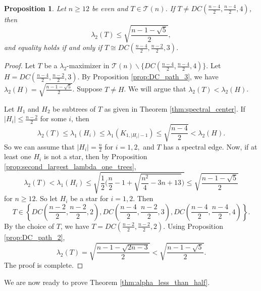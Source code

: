 \documentclass[11pt]{article}
\theoremstyle{plain}
\newtheorem{proposition}[theorem]{Proposition}
\numberwithin{equation}{section}
\begin{document}
\begin{proposition}\label{prop:second_maximum_lambda_2_even} Let $n\ge 12$ be even and $T\in \mathcal{T}(n)$. If $T\neq DC(\frac{n-4}{2}, \frac{n-4}{2}, 4)$, then 
\[ \lambda_2(T)\le \sqrt{\frac{n-1-\sqrt{5}}{2}},\]
and equality holds if and only if $T\cong DC(\frac{n-4}{2}, \frac{n-2}{2}, 3)$.
\end{proposition}
\begin{proof} Let $T$ be a $\lambda_2$-maximizer in $\mathcal{T}(n)\backslash \{DC(\frac{n-4}{2}, \frac{n-4}{2}, 4)\}$. Let $H=DC(\frac{n-4}{2}, \frac{n-2}{2}, 3)$. By Proposition \ref{prop:DC_path_3}, we have $\lambda_2(H)=\sqrt{\frac{n-1-\sqrt{5}}{2}}$. Suppose $T\neq H$. We will argue that $\lambda_2(T)<\lambda_2(H)$.

Let $H_1$ and $H_2$ be subtrees of $T$ as given in Theorem \ref{thm:spectral_center}. If $|H_i|\le \frac{n-2}{2}$ for some $i$, then  
\[ \lambda_2(T)\le \lambda_1(H_i)\le \lambda_1(K_{1, |H_i|-1})\le \sqrt{\frac{n-4}{2}} < \lambda_2(H).\]
So we can assume that $|H_i|=\frac{n}{2}$ for $i=1,2,$ and $T$ has a spectral edge. Now, if at least one $H_i$ is not a star, then by Proposition \ref{prop:second_largest_lambda_one_trees},
\[\lambda_2(T)<\lambda_1(H_i)\le \sqrt{\frac{1}{2}\bigg(\frac{n}{2}-1+\sqrt{\frac{n^2}{4}-3n+13}\bigg)} \le \sqrt{\frac{n-1-\sqrt{5}}{2}}\] 
for $n\ge 12$. So let $H_i$ be a star for $i=1,2$. Then 
\[T\in \left\{DC\left(\frac{n-2}{2}, \frac{n-2}{2}, 2\right), DC\left(\frac{n-4}{2}, \frac{n-2}{2}, 3\right), DC\left(\frac{n-4}{2}, \frac{n-4}{2}, 4\right)\right\}.\] 
By the choice of $T$, we have $T=DC(\frac{n-2}{2}, \frac{n-2}{2}, 2)$. Using Proposition \ref{prop:DC_path_2}, 
\[\lambda_2(T) = \sqrt{\frac{n-1-\sqrt{2n-3}}{2}} < \sqrt{\frac{n-1-\sqrt{5}}{2}}.\]
The proof is complete.
\end{proof}

We are now ready to prove Theorem \ref{thm:alpha_less_than_half}. 
\end{document}
